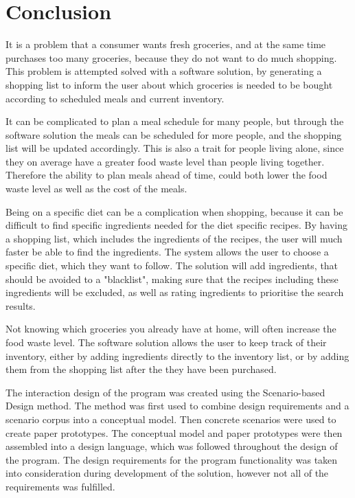 \chapter{Conclusion}
It is a problem that a consumer wants fresh groceries, and at the same time purchases too many groceries, because they do not want to do much shopping. This problem is attempted solved with a software solution, by generating a shopping list to inform the user about which groceries is needed to be bought according to scheduled meals and current inventory.

It can be complicated to plan a meal schedule for many people, but through the software solution the meals can be scheduled for more people, and the shopping list will be updated accordingly. This is also a trait for people living alone, since they on average have a greater food waste level than people living together. Therefore the ability to plan meals ahead of time, could both lower the food waste level as well as the cost of the meals.

Being on a specific diet can be a complication when shopping, because it can be difficult to find specific ingredients needed for the diet specific recipes. By having a shopping list, which includes the ingredients of the recipes, the user will much faster be able to find the ingredients. The system allows the user to choose a specific diet, which they want to follow. The solution will add ingredients, that should be avoided to a "blacklist", making sure that the recipes including these ingredients will be excluded, as well as rating ingredients to prioritise the search results.

Not knowing which groceries you already have at home, will often increase the food waste level. The software solution allows the user to keep track of their inventory, either by adding ingredients directly to the inventory list, or by adding them from the shopping list after the they have been purchased.

The interaction design of the program was created using the Scenario-based Design method. The method was first used to combine design requirements and a scenario corpus into a conceptual model. Then concrete scenarios were used to create paper prototypes. The conceptual model and paper prototypes were then assembled into a design language, which was followed throughout the design of the program. The design requirements for the program functionality was taken into consideration during development of the solution, however not all of the requirements was fulfilled.
